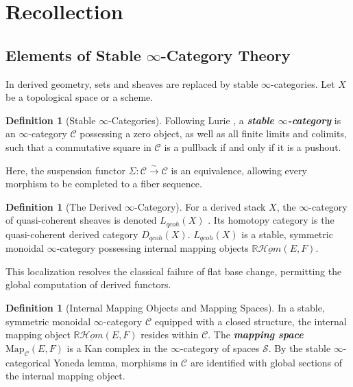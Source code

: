 \documentclass[reqno]{amsart}
\theoremstyle{definition}
\newtheorem{definition}[theorem]{Definition}
\theoremstyle{remark}
\newcommand{\bfem}[1]{\textbf{\textit{#1}}}
\begin{document}
\section{Recollection}

\subsection{Elements of Stable \texorpdfstring{$\infty$-}-Category Theory} \label{sec:stable_cats}

In derived geometry, sets and sheaves are
replaced by stable $\infty$-categories. Let $X$ be a topological space or a scheme.

\begin{definition}[Stable $\infty$-Categories]
  Following Lurie \cite[Section 1.1.1]{LurieHA}, a \bfem{stable
  $\infty$-category} is an
  $\infty$-category $\mathcal{C}$ possessing a zero object, as well
  as all finite limits and colimits, such that a
  commutative square in $\mathcal{C}$ is a pullback if and only if it
  is a pushout.
  
  Here, the suspension functor $\Sigma: \mathcal{C}
  \xrightarrow{\sim} \mathcal{C}$
  is an equivalence, allowing every morphism to be
  completed to a fiber sequence.
\end{definition}

\begin{definition}[The Derived $\infty$-Category]
  For a derived stack $X$, the $\infty$-category of quasi-coherent
  sheaves is denoted $L_{qcoh}(X)$ \cite[Section 1.1]{PTVV}. Its
  homotopy category is the quasi-coherent derived category
  $D_{qcoh}(X)$. $L_{qcoh}(X)$ is a stable, symmetric monoidal
  $\infty$-category possessing internal mapping objects
  $\mathbb{R}\underline{\mathcal{H}om}(E, F)$.
\end{definition}

This localization
resolves the classical failure of flat base change, permitting the
global computation of
derived functors.

\begin{definition}[Internal Mapping Objects and Mapping Spaces]
  In a stable, symmetric monoidal $\infty$-category $\mathcal{C}$
  equipped with a closed structure, the internal mapping object
  $\mathbb{R}\underline{\mathcal{H}om}(E, F)$ resides within
  $\mathcal{C}$. The \bfem{mapping space}
  $\mathrm{Map}_{\mathcal{C}}(E, F)$ is a Kan complex in the
  $\infty$-category of spaces $\mathcal{S}$. By the stable
  $\infty$-categorical Yoneda lemma, morphisms in $\mathcal{C}$ are
  identified with global sections of the internal mapping object.
\end{definition}
\end{document}
